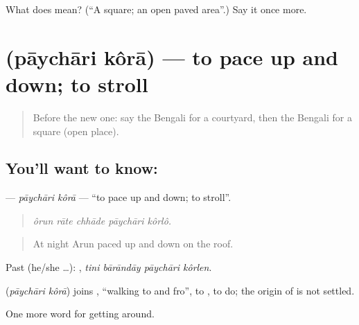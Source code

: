 \begin{tcolorbox}[breakable,colback=teal!4,colframe=teal!35!black,title={Before you move on}]
What does  mean? (\textquotedblleft{}A square; an open paved area\textquotedblright{}.) Say it once more.
\end{tcolorbox}
\section[\texorpdfstring{\bn{পায়চারি} \bn{করা} (pāychāri kôrā)}{পায়চারি করা (pāychāri kôrā)}]{  (pāychāri kôrā) — to pace up and down; to stroll}

\label{lesson:BN-C410-paychari-kora}



\begin{quote}
Before the new one: say the Bengali for a courtyard, then the Bengali for a square (open place).
\end{quote}

\subsection*{You'll want to know:  }
\textbf{ } — \emph{pāychāri kôrā} — \textquotedblleft{}to pace up and down; to stroll\textquotedblright{}.

\begin{quote}
    
\end{quote}

\begin{quote}
\emph{ôrun rāte chhāde pāychāri kôrlô.}
\end{quote}

\begin{quote}
At night Arun paced up and down on the roof.
\end{quote}

Past (he/she …):    , \emph{tini bārāndāy pāychāri kôrlen}.

\begin{cousinweb}
\textbf{ } (\emph{pāychāri kôrā}) joins , \textquotedblleft{}walking to and fro\textquotedblright{}, to , to do; the origin of  is not settled.
\end{cousinweb}

\begin{grammarlens}[title={What you've built}]
One more word for getting around.
\end{grammarlens}

